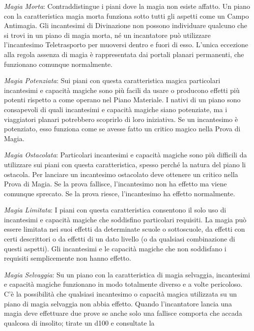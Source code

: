 \documentclass[a4paper,twoside,openany]{book}
\begin{document}
\begin{multicols}{2}
\medskip

\emph{Magia Morta}: Contraddistingue i piani dove la magia non esiste affatto. Un piano con la caratteristica magia morta funziona sotto tutti gli aspetti come un Campo Antimagia. Gli incantesimi di Divinazione non possono individuare qualcuno che si trovi in un piano di magia morta, né un incantatore può utilizzare l'incantesimo Teletrasporto per muoversi dentro e fuori di esso. L'unica eccezione alla regola assenza di magia è rappresentata dai portali planari permanenti, che funzionano comunque normalmente.

\medskip

\emph{Magia Potenziata}: Sui piani con questa caratteristica magica particolari incantesimi e capacità magiche sono più facili da usare o producono effetti più potenti rispetto a come operano nel Piano Materiale. I nativi di un piano sono consapevoli di quali incantesimi e capacità magiche siano potenziate, ma i viaggiatori planari potrebbero scoprirlo di loro iniziativa. Se un incantesimo è potenziato, esso funziona come se avesse fatto un critico magico nella Prova di Magia.

\medskip

\emph{Magia Ostacolata}: Particolari incantesimi e capacità magiche sono più difficili da utilizzare sui piani con questa caratteristica, spesso perché la natura del piano li ostacola. Per lanciare un incantesimo ostacolato deve ottenere un critico nella Prova di Magia. Se la prova fallisce, l'incantesimo non ha effetto ma viene comunque sprecato. Se la prova riesce, l'incantesimo ha effetto normalmente.

\medskip

\emph{Magia Limitata}: I piani con questa caratteristica consentono il solo uso di incantesimi e capacità magiche che soddisfino particolari requisiti. La magia può essere limitata nei suoi effetti da determinate scuole o sottoscuole, da effetti con certi descrittori o da effetti di un dato livello (o da qualsiasi combinazione di questi aspetti). Gli incantesimi e le capacità magiche che non soddisfano i requisiti semplicemente non hanno effetto.

\emph{Magia Selvaggia}: Su un piano con la caratteristica di magia selvaggia, incantesimi e capacità magiche funzionano in modo totalmente diverso e a volte pericoloso. C'è la possibilità che qualsiasi incantesimo o capacità magica utilizzata su un piano di magia selvaggia non abbia effetto. Quando l'incantatore lancia una magia deve effettuare due prove se anche solo una fallisce comporta che accada qualcosa di insolito; tirate un d100 e consultate la


\end{multicols}
\end{document}
